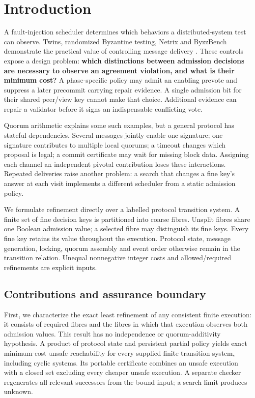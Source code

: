 \section{Introduction}\label{introduction}

A fault-injection scheduler determines which behaviors a
distributed-system test can observe. Twins, randomized Byzantine
testing, Netrix and ByzzBench demonstrate the practical value of
controlling message delivery
\cite{bano2021twins,winter2023randomized,dragoi2024netrix,louroneto2025byzzbench}.
These controls expose a design problem: \textbf{which distinctions
between admission decisions are necessary to observe an agreement
violation, and what is their minimum cost?} A phase-specific policy may
admit an enabling prevote and suppress a later precommit carrying repair
evidence. A single admission bit for their shared peer/view key cannot
make that choice. Additional evidence can repair a validator before it
signs an indispensable conflicting vote.

Quorum arithmetic explains some such examples, but a general protocol
has stateful dependencies. Several messages jointly enable one
signature; one signature contributes to multiple local quorums; a
timeout changes which proposal is legal; a commit certificate may wait
for missing block data. Assigning each channel an independent pivotal
contribution loses these interactions. Repeated deliveries raise another
problem: a search that changes a fine key's answer at each visit
implements a different scheduler from a static admission policy.

We formulate refinement directly over a labelled protocol transition
system. A finite set of fine decision keys is partitioned into coarse
fibres. Unsplit fibres share one Boolean admission value; a selected
fibre may distinguish its fine keys. Every fine key retains its value
throughout the execution. Protocol state, message generation, locking,
quorum assembly and event order otherwise remain in the transition
relation. Unequal nonnegative integer costs and allowed/required
refinements are explicit inputs.

\subsection{Contributions and assurance
boundary}\label{contributions-and-assurance-boundary}

First, we characterize the exact least refinement of any consistent
finite execution: it consists of required fibres and the fibres in which
that execution observes both admission values. This result has no
independence or quorum-additivity hypothesis. A product of protocol
state and persistent partial policy yields exact minimum-cost unsafe
reachability for every supplied finite transition system, including
cyclic systems. Its portable certificate combines an unsafe execution
with a closed set excluding every cheaper unsafe execution. A separate
checker regenerates all relevant successors from the bound input; a
search limit produces unknown.

